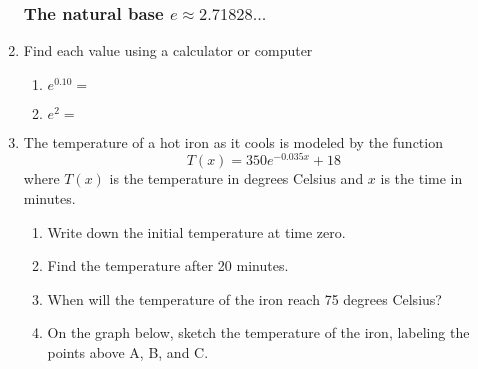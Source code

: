 \documentclass[12pt, twoside]{article}
\begin{document}
\begin{enumerate}
\newpage
\subsubsection*{The natural base $e \approx 2.71828 ...$}
\item Find each value using a calculator or computer
\begin{multicols}{2}
    \begin{enumerate}
        \item $e^{0.10}=$
        \item $e^{2}=$
    \end{enumerate}
\end{multicols}

\item The temperature of a hot iron as it cools is modeled by the function 
    \[ T(x)=350e^{-0.035x}+18 \] where $T(x)$
    is the temperature in degrees Celsius and $x$ is the time in minutes.
    \begin{enumerate}[itemsep=1cm]
        \item Write down the initial temperature at time zero.
        \item Find the temperature after 20 minutes.
        \item When will the temperature of the iron reach 75 degrees Celsius?
        \item On the graph below, sketch the temperature of the iron, labeling the points above A, B, and C.
    \end{enumerate}
    \begin{center}
    \end{center}

\end{enumerate}
\end{document}
